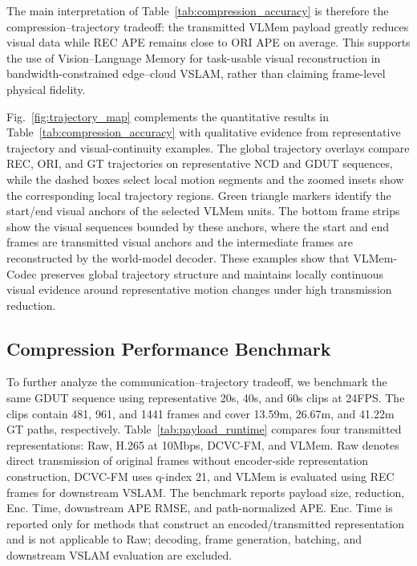 \documentclass[journal]{IEEEtran}
\begin{document}
The main interpretation of Table~\ref{tab:compression_accuracy} is therefore the compression--trajectory tradeoff: the transmitted VLMem payload greatly reduces visual data while REC APE remains close to ORI APE on average. This supports the use of Vision--Language Memory for task-usable visual reconstruction in bandwidth-constrained edge--cloud VSLAM, rather than claiming frame-level physical fidelity.

Fig.~\ref{fig:trajectory_map} complements the quantitative results in Table~\ref{tab:compression_accuracy} with qualitative evidence from representative trajectory and visual-continuity examples. The global trajectory overlays compare REC, ORI, and GT trajectories on representative NCD and GDUT sequences, while the dashed boxes select local motion segments and the zoomed insets show the corresponding local trajectory regions. Green triangle markers identify the start/end visual anchors of the selected VLMem units. The bottom frame strips show the visual sequences bounded by these anchors, where the start and end frames are transmitted visual anchors and the intermediate frames are reconstructed by the world-model decoder. These examples show that VLMem-Codec preserves global trajectory structure and maintains locally continuous visual evidence around representative motion changes under high transmission reduction.

\subsection{Compression Performance Benchmark}
\label{subsec:payload_runtime}

To further analyze the communication--trajectory tradeoff, we benchmark the same GDUT sequence using representative 20s, 40s, and 60s clips at 24FPS. The clips contain 481, 961, and 1441 frames and cover 13.59m, 26.67m, and 41.22m GT paths, respectively. Table~\ref{tab:payload_runtime} compares four transmitted representations: Raw, H.265 at 10Mbps, DCVC-FM, and VLMem. Raw denotes direct transmission of original frames without encoder-side representation construction, DCVC-FM uses q-index 21, and VLMem is evaluated using REC frames for downstream VSLAM. The benchmark reports payload size, reduction, Enc. Time, downstream APE RMSE, and path-normalized APE. Enc. Time is reported only for methods that construct an encoded/transmitted representation and is not applicable to Raw; decoding, frame generation, batching, and downstream VSLAM evaluation are excluded.
\end{document}
